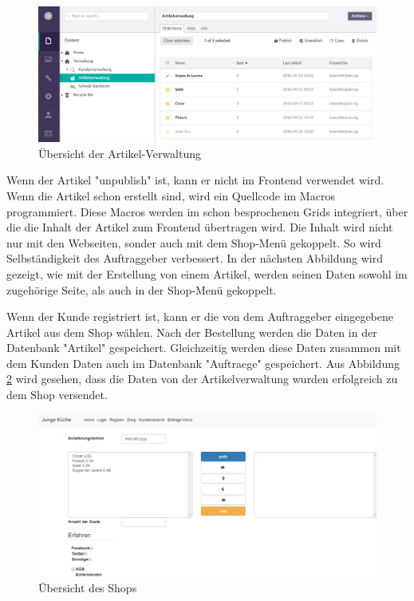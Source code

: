 \begin{figure}[h]
	\centering
	\includegraphics[width=1\linewidth]{Graphics/ArtikelVerwaltung.png}
	\caption[ArtikelVerwaltung]{Übersicht der Artikel-Verwaltung}
	\label{fig:ArtikelVerwaltung}
\end{figure}

Wenn der Artikel "unpublish" ist, kann er nicht im Frontend verwendet wird. Wenn die Artikel schon erstellt sind, wird ein Quellcode im Macros programmiert. Diese Macros werden im schon besprochenen Grids integriert, über die die Inhalt der Artikel zum Frontend übertragen wird. 
Die Inhalt wird nicht nur mit den Webseiten, sonder auch mit dem Shop-Menü gekoppelt. So wird Selbständigkeit des Auftraggeber verbessert. In der nächsten Abbildung wird gezeigt, wie mit der Erstellung von einem Artikel, werden seinen Daten sowohl im zugehörige Seite, als auch in der Shop-Menü gekoppelt.
 
Wenn der Kunde registriert ist, kann er die von dem Auftraggeber eingegebene Artikel aus dem Shop wählen. Nach der Bestellung werden die Daten in der Datenbank "Artikel" gespeichert. Gleichzeitig werden diese Daten zusammen mit dem Kunden Daten auch im Datenbank "Auftraege" gespeichert. Aus Abbildung \ref{fig:Shop} wird gesehen, dass die Daten von der Artikelverwaltung wurden erfolgreich zu dem Shop versendet.

\begin{figure}[h]
	\centering
	\includegraphics[width=1\linewidth]{Graphics/shop.png}
	\caption[Shop]{Übersicht des Shops}
	\label{fig:Shop}
\end{figure}



